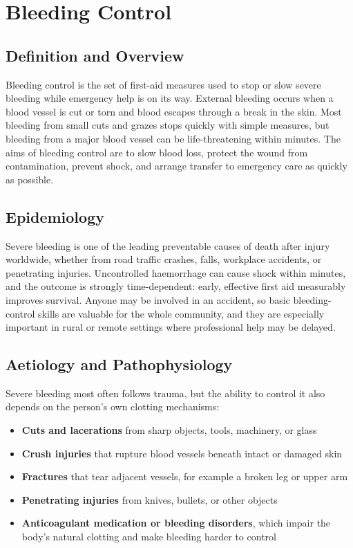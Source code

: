 \chapter{Bleeding Control}

\section*{Definition and Overview}
Bleeding control is the set of first-aid measures used to stop or slow severe bleeding while emergency help is on its way. External bleeding occurs when a blood vessel is cut or torn and blood escapes through a break in the skin. Most bleeding from small cuts and grazes stops quickly with simple measures, but bleeding from a major blood vessel can be life-threatening within minutes. The aims of bleeding control are to slow blood loss, protect the wound from contamination, prevent shock, and arrange transfer to emergency care as quickly as possible.

\section*{Epidemiology}
Severe bleeding is one of the leading preventable causes of death after injury worldwide, whether from road traffic crashes, falls, workplace accidents, or penetrating injuries. Uncontrolled haemorrhage can cause shock within minutes, and the outcome is strongly time-dependent: early, effective first aid measurably improves survival. Anyone may be involved in an accident, so basic bleeding-control skills are valuable for the whole community, and they are especially important in rural or remote settings where professional help may be delayed.

\section*{Aetiology and Pathophysiology}
Severe bleeding most often follows trauma, but the ability to control it also depends on the person's own clotting mechanisms:

\begin{itemize}
    \item \textbf{Cuts and lacerations} from sharp objects, tools, machinery, or glass
    \item \textbf{Crush injuries} that rupture blood vessels beneath intact or damaged skin
    \item \textbf{Fractures} that tear adjacent vessels, for example a broken leg or upper arm
    \item \textbf{Penetrating injuries} from knives, bullets, or other objects
    \item \textbf{Anticoagulant medication or bleeding disorders}, which impair the body's natural clotting and make bleeding harder to control
\end{itemize}

